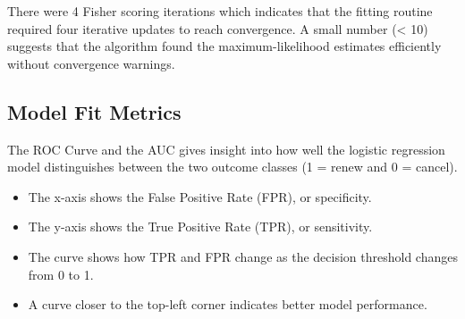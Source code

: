 \documentclass[
]{article}
\newenvironment{Shaded}{\begin{snugshade}}{\end{snugshade}}
\newcommand{\AttributeTok}[1]{\textcolor[rgb]{0.13,0.29,0.53}{#1}}
\newcommand{\FunctionTok}[1]{\textcolor[rgb]{0.13,0.29,0.53}{\textbf{#1}}}
\newcommand{\NormalTok}[1]{#1}
\newcommand{\OtherTok}[1]{\textcolor[rgb]{0.56,0.35,0.01}{#1}}
\newcommand{\SpecialCharTok}[1]{\textcolor[rgb]{0.81,0.36,0.00}{\textbf{#1}}}
\newcommand{\StringTok}[1]{\textcolor[rgb]{0.31,0.60,0.02}{#1}}
\begin{document}
There were 4 Fisher scoring iterations which indicates that the fitting
routine required four iterative updates to reach convergence. A small
number (\textless{} 10) suggests that the algorithm found the
maximum-likelihood estimates efficiently without convergence warnings.

\subsection{Model Fit Metrics}\label{model-fit-metrics}

The ROC Curve and the AUC gives insight into how well the logistic
regression model distinguishes between the two outcome classes (1 =
renew and 0 = cancel).

\begin{itemize}
\item
  The x-axis shows the False Positive Rate (FPR), or specificity.
\item
  The y-axis shows the True Positive Rate (TPR), or sensitivity.
\item
  The curve shows how TPR and FPR change as the decision threshold
  changes from 0 to 1.
\item
  A curve closer to the top-left corner indicates better model
  performance.
\end{itemize}

\begin{Shaded}
\end{Shaded}
\end{document}
